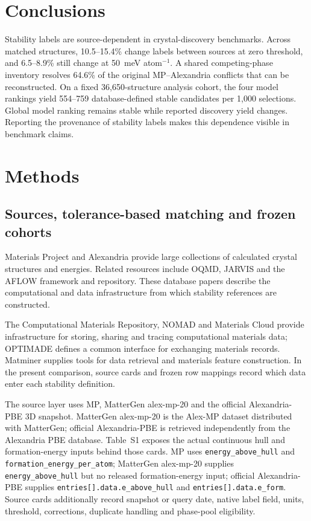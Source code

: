 \documentclass[twoside,twocolumn,9pt]{article}
\begin{document}
\section{Conclusions}\label{sec:conclusions}

Stability labels are source-dependent in crystal-discovery benchmarks. Across matched structures, 10.5--15.4\% change labels between sources at zero threshold, and 6.5--8.9\% still change at 50~meV atom$^{-1}$. A shared competing-phase inventory resolves 64.6\% of the original MP--Alexandria conflicts that can be reconstructed. On a fixed 36,650-structure analysis cohort, the four model rankings yield 554--759 database-defined stable candidates per 1,000 selections. Global model ranking remains stable while reported discovery yield changes. Reporting the provenance of stability labels makes this dependence visible in benchmark claims.

\section{Methods}\label{sec:methods}

\subsection{Sources, tolerance-based matching and frozen cohorts}

Materials Project and Alexandria provide large collections of calculated crystal structures and energies.\cite{jain2013commentary,schmidt2023machine} Related resources include OQMD,\cite{saal2013materials,kirklin2015open} JARVIS\cite{choudhary2020joint} and the AFLOW framework and repository.\cite{curtarolo2012aflow,curtarolo2012aflowlib} These database papers describe the computational and data infrastructure from which stability references are constructed.

The Computational Materials Repository, NOMAD and Materials Cloud provide infrastructure for storing, sharing and tracing computational materials data; OPTIMADE defines a common interface for exchanging materials records.\cite{landis2012computational,draxl2019nomad,talirz2020materials,andersen2021optimade} Matminer supplies tools for data retrieval and materials feature construction.\cite{ward2018matminer} In the present comparison, source cards and frozen row mappings record which data enter each stability definition.

The source layer uses MP, MatterGen alex-mp-20 and the official Alexandria-PBE 3D snapshot. MatterGen alex-mp-20 is the Alex-MP dataset distributed with MatterGen; official Alexandria-PBE is retrieved independently from the Alexandria PBE database. Table~S1 exposes the actual continuous hull and formation-energy inputs behind those cards. MP uses \texttt{energy\_above\_hull} and \texttt{formation\_energy\_per\_atom}; MatterGen alex-mp-20 supplies \texttt{energy\_above\_hull} but no released formation-energy input; official Alexandria-PBE supplies \texttt{entries[].data.e\_above\_hull} and \texttt{entries[].data.e\_form}. Source cards additionally record snapshot or query date, native label field, units, threshold, corrections, duplicate handling and phase-pool eligibility.
\end{document}
